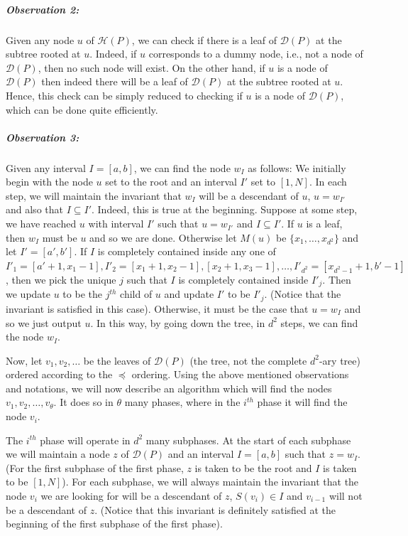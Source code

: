 \subparagraph*{Observation 2: } Given any node $u$ of $\mathcal{H}(P)$, we can check if 
there is a leaf of $\mathcal{D}(P)$ at the subtree rooted at $u$. Indeed, if $u$
corresponds to a dummy node, i.e., not a node of $\mathcal{D}(P)$, then
no such node will exist. On the other hand, if $u$ is a node of $\mathcal{D}(P)$
then indeed there will be a leaf of $\mathcal{D}(P)$ at the subtree rooted at $u$.
Hence, this check can be simply reduced to checking if $u$ is a node of $\mathcal{D}(P)$,
which can be done quite efficiently.

\subparagraph*{Observation 3: } Given any interval $I = [a,b]$, we can find the node 
$w_{I}$ as follows: We initially begin with the node $u$ set to the root and an interval $I'$ set to $[1,N]$. In each step, we will maintain the invariant that $w_I$ will be a descendant of $u$, $u = w_{I'}$ and also that $I \subseteq I'$. Indeed, this is true at the beginning.
Suppose at some step, we have reached $u$ with interval $I'$ such that $u = w_{I'}$
and $I \subseteq I'$. If $u$ is a leaf, then $w_I$ must be $u$ and so we are done.
Otherwise let $M(u)$ be $\{x_1,\dots,x_{d^2}\}$ and let $I' = [a',b']$. If $I$ is completely contained
inside any one of $I'_1 = [a'+1,x_1-1], I'_2 = [x_1+1,x_2-1], [x_2+1,x_3-1],\dots, I'_{d^2} = [x_{d^2-1}+1,b'-1]$, then we pick the unique $j$ such that $I$ is completely contained inside $I'_j$. Then we update $u$ to be the $j^{th}$ child of $u$ and update $I'$ to be $I'_j$. (Notice that the invariant is satisfied in this case). Otherwise,
it must be the case that $u = w_I$ and so we just output $u$. In this way, by going down the tree, in $d^2$ steps, we can find the node $w_I$.


Now, let $v_1,v_2,\dots$ be the leaves of $\mathcal{D}(P)$ (the \trust tree, not the complete $d^2$-ary tree) ordered according to the $\preceq$ ordering. Using the above mentioned observations and notations, we will now describe an algorithm which will find the nodes $v_1,v_2,\dots,v_{\theta}$. It does so in $\theta$ many phases, where in the $i^{th}$ phase it will find the node $v_i$.

The $i^{th}$ phase will operate in $d^2$ many subphases. At the start of each subphase
we will maintain a node $z$ of $\mathcal{D}(P)$ and an interval $I = [a,b]$ such that
$z = w_I$. (For the first subphase of the first phase, $z$ is taken to be the root and $I$ is taken to be $[1,N]$). For each subphase, we will always maintain the invariant that the node $v_i$ we are looking for will be a 
descendant of $z$, $S(v_i) \in I$ and $v_{i-1}$ will not be a descendant of $z$. (Notice that this invariant is definitely satisfied at the beginning of the first subphase of the first phase).

